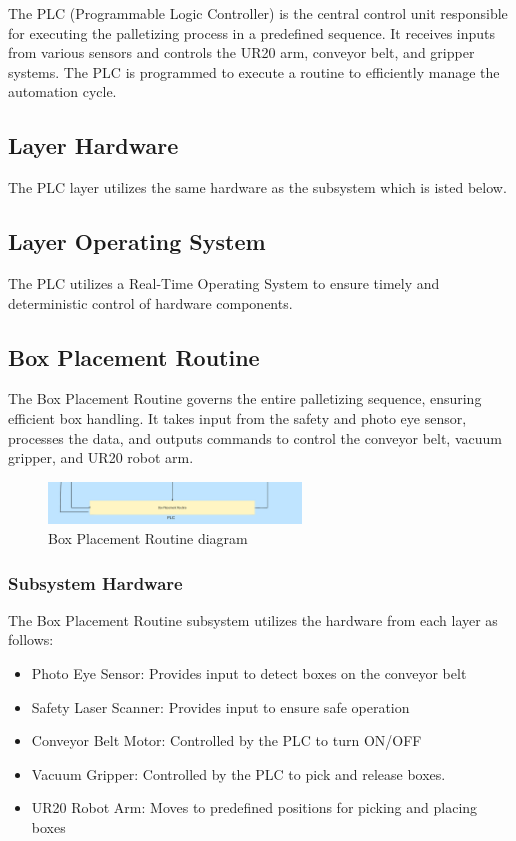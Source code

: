 The PLC (Programmable Logic Controller) is the central control unit responsible for executing the palletizing process in a predefined sequence. It receives inputs from various sensors and controls the UR20 arm, conveyor belt, and gripper systems. The PLC is programmed to execute a routine to efficiently manage the automation cycle.
\subsection{Layer Hardware}
The PLC layer utilizes the same hardware as the subsystem which is isted below.

\subsection{Layer Operating System}
The PLC utilizes a Real-Time Operating System to ensure timely and deterministic control of hardware components.

\subsection{Box Placement Routine}

The Box Placement Routine governs the entire palletizing sequence, ensuring efficient box handling. It takes input from the safety and photo eye sensor, processes the data, and outputs commands to control the conveyor belt, vacuum gripper, and UR20 robot arm.

\begin{figure}[h!]
	\centering
 	\includegraphics[width=0.60\textwidth]{images/plc.png}
 \caption{Box Placement Routine diagram}
\end{figure}

\subsubsection{Subsystem Hardware}
The Box Placement Routine subsystem utilizes the hardware from each layer as follows:
    \begin{itemize}
        \item Photo Eye Sensor: Provides input to detect boxes on the conveyor belt
        \item Safety Laser Scanner: Provides input to ensure safe operation
        \item Conveyor Belt Motor: Controlled by the PLC to turn ON/OFF
        \item Vacuum Gripper: Controlled by the PLC to pick and release boxes.
        \item UR20 Robot Arm: Moves to predefined positions for picking and placing boxes
    \end{itemize}


